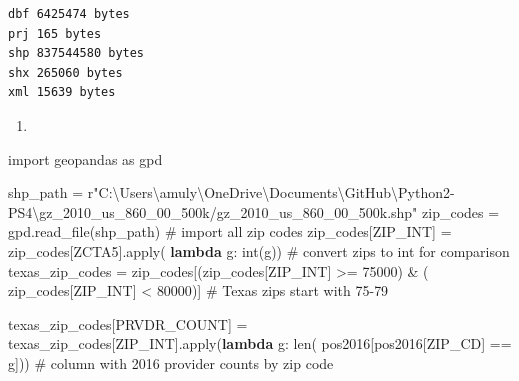 \documentclass[
  letterpaper,
  DIV=11,
  numbers=noendperiod]{scrartcl}
\newenvironment{Shaded}{\begin{snugshade}}{\end{snugshade}}
\newcommand{\BuiltInTok}[1]{\textcolor[rgb]{0.00,0.23,0.31}{#1}}
\newcommand{\CommentTok}[1]{\textcolor[rgb]{0.37,0.37,0.37}{#1}}
\newcommand{\DecValTok}[1]{\textcolor[rgb]{0.68,0.00,0.00}{#1}}
\newcommand{\ImportTok}[1]{\textcolor[rgb]{0.00,0.46,0.62}{#1}}
\newcommand{\KeywordTok}[1]{\textcolor[rgb]{0.00,0.23,0.31}{\textbf{#1}}}
\newcommand{\NormalTok}[1]{\textcolor[rgb]{0.00,0.23,0.31}{#1}}
\newcommand{\OperatorTok}[1]{\textcolor[rgb]{0.37,0.37,0.37}{#1}}
\newcommand{\StringTok}[1]{\textcolor[rgb]{0.13,0.47,0.30}{#1}}
\newcommand{\VerbatimStringTok}[1]{\textcolor[rgb]{0.13,0.47,0.30}{#1}}
\providecommand{\tightlist}{%
  \setlength{\itemsep}{0pt}\setlength{\parskip}{0pt}}\usepackage{longtable,booktabs,array}
\begin{document}
\begin{verbatim}
dbf 6425474 bytes
prj 165 bytes
shp 837544580 bytes
shx 265060 bytes
xml 15639 bytes
\end{verbatim}

\begin{enumerate}
\def\labelenumi{\arabic{enumi}.}
\setcounter{enumi}{1}
\tightlist
\item
\end{enumerate}

\begin{Shaded}
\begin{Highlighting}[]
\ImportTok{import}\NormalTok{ geopandas }\ImportTok{as}\NormalTok{ gpd}

\NormalTok{shp\_path }\OperatorTok{=} \VerbatimStringTok{r"C:\textbackslash{}Users\textbackslash{}amuly\textbackslash{}OneDrive\textbackslash{}Documents\textbackslash{}GitHub\textbackslash{}Python2{-}PS4\textbackslash{}gz\_2010\_us\_860\_00\_500k/gz\_2010\_us\_860\_00\_500k.shp"}
\NormalTok{zip\_codes }\OperatorTok{=}\NormalTok{ gpd.read\_file(shp\_path)  }\CommentTok{\# import all zip codes}
\NormalTok{zip\_codes[}\StringTok{\textquotesingle{}ZIP\_INT\textquotesingle{}}\NormalTok{] }\OperatorTok{=}\NormalTok{ zip\_codes[}\StringTok{\textquotesingle{}ZCTA5\textquotesingle{}}\NormalTok{].}\BuiltInTok{apply}\NormalTok{(}
    \KeywordTok{lambda}\NormalTok{ g: }\BuiltInTok{int}\NormalTok{(g))  }\CommentTok{\# convert zips to int for comparison}
\NormalTok{texas\_zip\_codes }\OperatorTok{=}\NormalTok{ zip\_codes[(zip\_codes[}\StringTok{\textquotesingle{}ZIP\_INT\textquotesingle{}}\NormalTok{] }\OperatorTok{\textgreater{}=} \DecValTok{75000}\NormalTok{) }\OperatorTok{\&}\NormalTok{ (}
\NormalTok{    zip\_codes[}\StringTok{\textquotesingle{}ZIP\_INT\textquotesingle{}}\NormalTok{] }\OperatorTok{\textless{}} \DecValTok{80000}\NormalTok{)]  }\CommentTok{\# Texas zips start with 75{-}79}

\NormalTok{texas\_zip\_codes[}\StringTok{\textquotesingle{}PRVDR\_COUNT\textquotesingle{}}\NormalTok{] }\OperatorTok{=}\NormalTok{ texas\_zip\_codes[}\StringTok{\textquotesingle{}ZIP\_INT\textquotesingle{}}\NormalTok{].}\BuiltInTok{apply}\NormalTok{(}\KeywordTok{lambda}\NormalTok{ g: }\BuiltInTok{len}\NormalTok{(}
\NormalTok{    pos2016[pos2016[}\StringTok{\textquotesingle{}ZIP\_CD\textquotesingle{}}\NormalTok{] }\OperatorTok{==}\NormalTok{ g]))  }\CommentTok{\# column with 2016 provider counts by zip code}


\end{Highlighting}
\end{Shaded}
\end{document}
